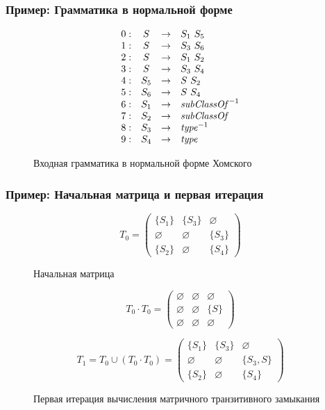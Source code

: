 \documentclass{beamer}
\begin{document}
\begin{frame}[fragile]
	\transwipe[direction=90]
	\frametitle{Пример: Грамматика в нормальной форме}
\begin{figure}[h]
   \[
\begin{array}{rccl}
   0: & S & \rightarrow & S_1 \ S_5 \\
   1: & S & \rightarrow & S_3 \ S_6 \\
   2: & S & \rightarrow & S_1 \ S_2 \\
   3: & S & \rightarrow & S_3 \ S_4 \\
   4: & S_5 & \rightarrow & S \ S_2 \\
   5: & S_6 & \rightarrow & S \ S_4 \\
   6: & S_1 & \rightarrow & \text{\textit{subClassOf}}^{-1} \\ 
   7: & S_2 & \rightarrow & \text{\textit{subClassOf}} \\ 
   8: & S_3 & \rightarrow & \text{\textit{type}}^{-1} \\
   9: & S_4 & \rightarrow & \text{\textit{type}} \\ 
\end{array}
\]
\caption{Входная грамматика в нормальной форме Хомского}
\label{ProductionRulesExampleQueryCNF}
\end{figure}
\end{frame}

\begin{frame}[fragile]
	\transwipe[direction=90]
	\frametitle{Пример: Начальная матрица и первая итерация}
\begin{figure}[h]
\[
T_0 = \begin{pmatrix}
    \{S_1\} & \{S_3\} & \varnothing \\ \varnothing & \varnothing & \{S_3\} \\ \{S_2\} & \varnothing & \{S_4\}
\end{pmatrix}
\]
\caption{Начальная матрица}
\label{ExampleQueryInitMatrix}
\end{figure}

\begin{figure}[h]
\[
T_0 \cdot T_0 = \begin{pmatrix}
    \varnothing & \varnothing & \varnothing \\ \varnothing & \varnothing & \{S\} \\ \varnothing & \varnothing & \varnothing
\end{pmatrix}
\]

\[
T_1 = T_0 \cup (T_0 \cdot T_0) = \begin{pmatrix}
    \{S_1\} & \{S_3\} & \varnothing \\ \varnothing & \varnothing & \{S_3, S\} \\ \{S_2\} & \varnothing & \{S_4\}
\end{pmatrix}
\]
\caption{Первая итерация вычисления матричного транзитивного замыкания}
\label{ExampleQueryFirstIteration}
\end{figure}
\end{frame}
\end{document}
